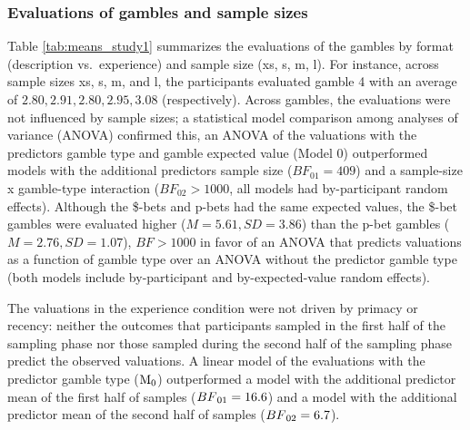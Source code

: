 \documentclass[
  a4paper, man, floatsintext]{apa6}
\author{Jana B. Jarecki}
\date{13 Mai, 2020}
\begin{document}
\subsubsection{Evaluations of gambles and sample sizes}

Table \ref{tab:means_study1} summarizes the evaluations of the gambles
by format (description vs.~experience) and sample size (xs, s, m, l).
For instance, across sample sizes xs, s, m, and l, the participants
evaluated gamble 4 with an average of \(2.80, 2.91, 2.80, 2.95, 3.08\)
(respectively). Across gambles, the evaluations were not influenced by
sample sizes; a statistical model comparison among analyses of variance
(ANOVA) confirmed this, an ANOVA of the valuations with the predictors
gamble type and gamble expected value (Model 0) outperformed models with
the additional predictors sample size (\(BF_{01} = 409\)) and a
sample-size x gamble-type interaction (\(BF_{02} > 1000\), all models
had by-participant random effects). Although the \$-bets and p-bets had
the same expected values, the \$-bet gambles were evaluated higher
(\(M=5.61, SD=3.86\)) than the p-bet gambles (\(M=2.76, SD=1.07\)),
\(BF > 1000\) in favor of an ANOVA that predicts valuations as a
function of gamble type over an ANOVA without the predictor gamble type
(both models include by-participant and by-expected-value random
effects).

The valuations in the experience condition were not driven by primacy or
recency: neither the outcomes that participants sampled in the first
half of the sampling phase nor those sampled during the second half of
the sampling phase predict the observed valuations. A linear model of
the evaluations with the predictor gamble type
(\(\mathrm{M}\textsubscript{0}\)) outperformed a model with the
additional predictor mean of the first half of samples
(\(BF\textsubscript{01} = 16.6\)) and a model with the additional
predictor mean of the second half of samples
(\(BF\textsubscript{02} = 6.7\)).

\end{document}
